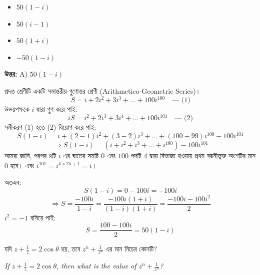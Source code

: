\documentclass[12pt, a4paper]{article}
\begin{document}
\begin{itemize}[label={}, leftmargin=1cm, itemsep=0.5em]
    \item[\textbf{A)}] $50(1 - i)$
    \item[\textbf{B)}] $50(i - 1)$
    \item[\textbf{C)}] $50(1 + i)$
    \item[\textbf{D)}] $-50(1 - i)$
\end{itemize}

\vspace{0.5em}
\begin{tcolorbox}[answerbox]
    \textbf{\color{success} উত্তর:} A) $50(1 - i)$
\end{tcolorbox}
\vspace{1em}

\begin{tcolorbox}[solutionbox={সমাধান (Solution)}]
    \noindent
    প্রদত্ত শ্রেণীটি একটি সমান্তরীয়-গুণোত্তর শ্রেণী (Arithmetico-Geometric Series)।
    \[ S = i + 2i^2 + 3i^3 + \dots + 100i^{100} \quad \text{--- (1)} \]
    উভয়পক্ষকে $i$ দ্বারা গুণ করে পাই:
    \[ i S = i^2 + 2i^3 + 3i^4 + \dots + 100i^{101} \quad \text{--- (2)} \]
    সমীকরণ (1) হতে (2) বিয়োগ করে পাই:
    \[ S(1 - i) = i + (2-1)i^2 + (3-2)i^3 + \dots + (100-99)i^{100} - 100i^{101} \]
    \[ \Rightarrow S(1 - i) = (i + i^2 + i^3 + \dots + i^{100}) - 100i^{101} \]
    আমরা জানি, পরপর ৪টি $i$ এর ঘাতের সমষ্টি $0$ এবং $100$ পদটি $4$ দ্বারা বিভাজ্য হওয়ায় প্রথম বন্ধনীভুক্ত অংশটির মান $0$ হবে। এবং $i^{101} = i^{4 \times 25 + 1} = i$।
    
    \vspace{0.5em}
    অতএব:
    \[ S(1 - i) = 0 - 100i = -100i \]
    \[ \Rightarrow S = \frac{-100i}{1 - i} = \frac{-100i(1+i)}{(1-i)(1+i)} = \frac{-100i - 100i^2}{2} \]
    $i^2 = -1$ বসিয়ে পাই:
    \[ S = \frac{100 - 100i}{2} = 50(1 - i) \]
\end{tcolorbox}
\vspace{1em}

\begin{tcolorbox}[questionbox={প্রশ্ন (Question) 25}]
    \noindent
    যদি $z + \frac{1}{z} = 2\cos\theta$ হয়, তবে $z^n + \frac{1}{z^n}$ এর মান নিচের কোনটি?
    
    \vspace{0.8em}
    \begin{english}
    \noindent\textit{\color{darkgray}
    If $z + \frac{1}{z} = 2\cos\theta$, then what is the value of $z^n + \frac{1}{z^n}$?
    }
    \end{english}
\end{tcolorbox}
\end{document}

